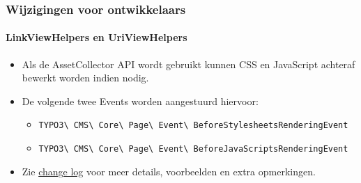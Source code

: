 \begin{frame}[fragile]
	\frametitle{Wijzigingen voor ontwikkelaars}
	\framesubtitle{LinkViewHelpers en UriViewHelpers}

	\begin{itemize}
		\item Als de AssetCollector API wordt gebruikt kunnen CSS en JavaScript
			achteraf bewerkt worden indien nodig.
		\item De volgende twee Events worden aangestuurd hiervoor:
			\begin{itemize}\smaller
				\item \texttt{TYPO3\textbackslash
					CMS\textbackslash
					Core\textbackslash
					Page\textbackslash
					Event\textbackslash
					BeforeStylesheetsRenderingEvent}
				\item \texttt{TYPO3\textbackslash
					CMS\textbackslash
					Core\textbackslash
					Page\textbackslash
					Event\textbackslash
					BeforeJavaScriptsRenderingEvent}
			\end{itemize}

		\item Zie
			\href{https://docs.typo3.org/c/typo3/cms-core/master/en-us/Changelog/10.4/Feature-90899-IntroduceAssetPreRenderingEvents.html}{change log}
			voor meer details, voorbeelden en extra opmerkingen.
	\end{itemize}

\end{frame}

